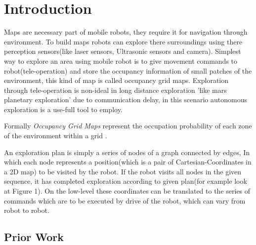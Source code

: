 \section{Introduction}
\label{sec:intro}
Maps are necessary part of mobile robots, they require it for navigation through environment. To build
maps robots can explore there surroundings using there perception sensors(like laser sensors,
Ultrasonic sensors and camera). Simplest way to explore an area using mobile robot is to give movement
commands to robot(tele-operation) and store the occupancy information of small patches of the environment,
this kind of map is called occupancy grid maps. Exploration through tele-operation is non-ideal in long
distance exploration 'like mars planetary exploration' due to communication delay, in this scenario
autonomous exploration is a use-full tool to employ.
\par
Formally \textit{Occupancy Grid Maps} represent the occupation probability of each zone of the
environment within a grid \cite{Juliae2012}.
\par
An exploration plan is simply a series of nodes of a graph connected by edges,
In which each node represents a position(which is a pair of Cartesian-Coordinates in a 2D map)
to be visited by the robot. If the robot visits all nodes in the given sequence,
it has completed exploration according to given plan(for example look at Figure 1).
On the low-level these coordinates can be translated to the series of commands which are to be
executed by drive of the robot, which can vary from robot to robot.
\par


\subsection{Prior Work}
\label{sec:priorwork}
